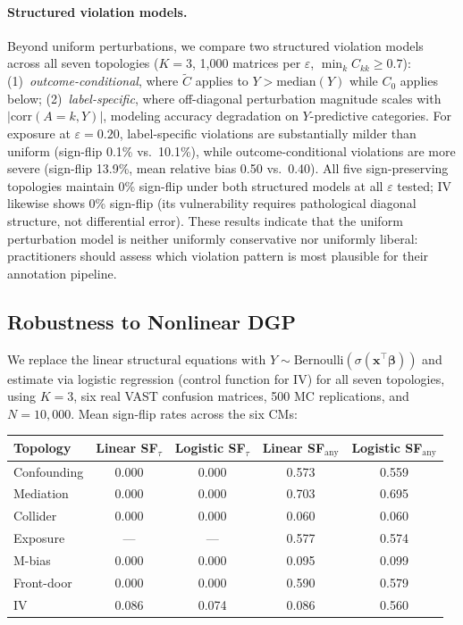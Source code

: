 \paragraph{Structured violation models.}
Beyond uniform perturbations, we compare two structured violation models across all seven topologies ($K{=}3$, 1{,}000 matrices per $\varepsilon$, $\min_k C_{kk}{\geq}0.7$): (1)~\emph{outcome-conditional}, where $\tilde{C}$ applies to $Y{>}\text{median}(Y)$ while $C_0$ applies below; (2)~\emph{label-specific}, where off-diagonal perturbation magnitude scales with $|\text{corr}(A{=}k, Y)|$, modeling accuracy degradation on $Y$-predictive categories. For exposure at $\varepsilon{=}0.20$, label-specific violations are substantially milder than uniform (sign-flip 0.1\% vs.\ 10.1\%), while outcome-conditional violations are more severe (sign-flip 13.9\%, mean relative bias 0.50 vs.\ 0.40). All five sign-preserving topologies maintain 0\% sign-flip under both structured models at all $\varepsilon$ tested; IV likewise shows 0\% sign-flip (its vulnerability requires pathological diagonal structure, not differential error). These results indicate that the uniform perturbation model is neither uniformly conservative nor uniformly liberal: practitioners should assess which violation pattern is most plausible for their annotation pipeline.

\subsection{Robustness to Nonlinear DGP}
\label{sec:logistic_dgp}

We replace the linear structural equations with $Y \sim \text{Bernoulli}(\sigma(\mathbf{x}^\top\boldsymbol{\beta}))$ and estimate via logistic regression (control function for IV) for all seven topologies, using $K{=}3$, six real VAST confusion matrices, 500 MC replications, and $N{=}10{,}000$. Mean sign-flip rates across the six CMs:

\begin{center}
\small
\begin{tabular}{lcccc}
\toprule
Topology & Linear SF$_\tau$ & Logistic SF$_\tau$ & Linear SF$_\text{any}$ & Logistic SF$_\text{any}$ \\
\midrule
Confounding & 0.000 & 0.000 & 0.573 & 0.559 \\
Mediation & 0.000 & 0.000 & 0.703 & 0.695 \\
Collider & 0.000 & 0.000 & 0.060 & 0.060 \\
Exposure & --- & --- & 0.577 & 0.574 \\
M-bias & 0.000 & 0.000 & 0.095 & 0.099 \\
Front-door & 0.000 & 0.000 & 0.590 & 0.579 \\
IV & 0.086 & 0.074 & 0.086 & 0.560 \\
\bottomrule
\end{tabular}
\end{center}

